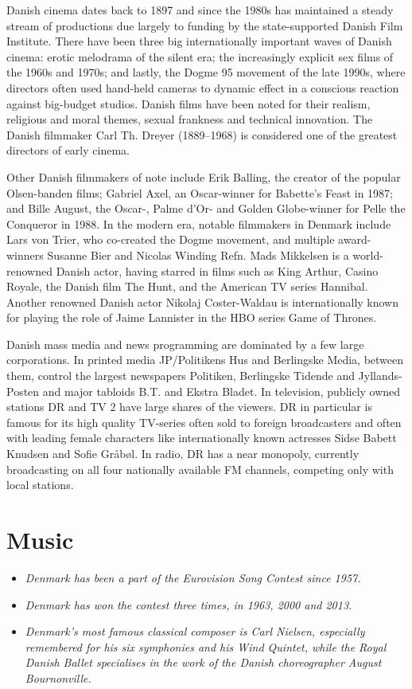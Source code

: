 Danish cinema dates back to 1897 and since the 1980s has maintained a
steady stream of productions due largely to funding by the
state-supported Danish Film Institute. There have been three big
internationally important waves of Danish cinema: erotic melodrama of
the silent era; the increasingly explicit sex films of the 1960s and
1970s; and lastly, the Dogme 95 movement of the late 1990s, where
directors often used hand-held cameras to dynamic effect in a conscious
reaction against big-budget studios. Danish films have been noted for
their realism, religious and moral themes, sexual frankness and
technical innovation. The Danish filmmaker Carl Th. Dreyer (1889--1968)
is considered one of the greatest directors of early cinema.

Other Danish filmmakers of note include Erik Balling, the creator of the
popular Olsen-banden films; Gabriel Axel, an Oscar-winner for Babette's
Feast in 1987; and Bille August, the Oscar-, Palme d'Or- and Golden
Globe-winner for Pelle the Conqueror in 1988. In the modern era, notable
filmmakers in Denmark include Lars von Trier, who co-created the Dogme
movement, and multiple award-winners Susanne Bier and Nicolas Winding
Refn. Mads Mikkelsen is a world-renowned Danish actor, having starred in
films such as King Arthur, Casino Royale, the Danish film The Hunt, and
the American TV series Hannibal. Another renowned Danish actor Nikolaj
Coster-Waldau is internationally known for playing the role of Jaime
Lannister in the HBO series Game of Thrones.

Danish mass media and news programming are dominated by a few large
corporations. In printed media JP/Politikens Hus and Berlingske Media,
between them, control the largest newspapers Politiken, Berlingske
Tidende and Jyllands-Posten and major tabloids B.T. and Ekstra Bladet.
In television, publicly owned stations DR and TV 2 have large shares of
the viewers. DR in particular is famous for its high quality TV-series
often sold to foreign broadcasters and often with leading female
characters like internationally known actresses Sidse Babett Knudsen and
Sofie Gråbøl. In radio, DR has a near monopoly, currently broadcasting
on all four nationally available FM channels, competing only with local
stations.

\section{Music}\label{music}

\begin{itemize}
\item
  \emph{Denmark has been a part of the Eurovision Song Contest since
  1957.}
\item
  \emph{Denmark has won the contest three times, in 1963, 2000 and
  2013.}
\item
  \emph{Denmark's most famous classical composer is Carl Nielsen,
  especially remembered for his six symphonies and his Wind Quintet,
  while the Royal Danish Ballet specialises in the work of the Danish
  choreographer August Bournonville.}
\end{itemize}


